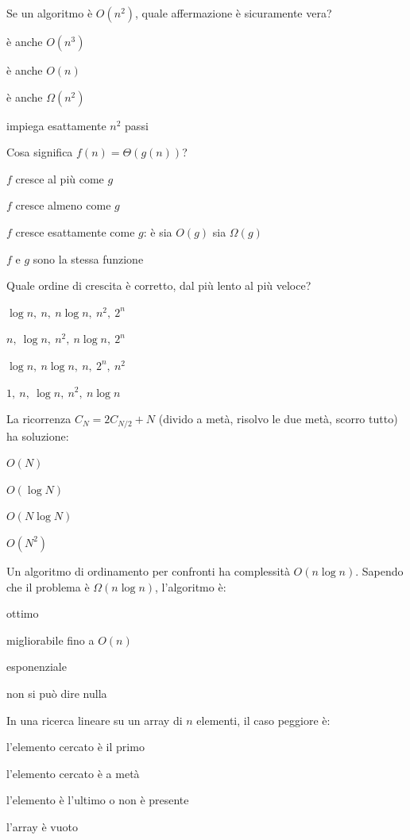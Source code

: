 \begin{quiz}{Se un algoritmo è $O(n^2)$, quale affermazione è sicuramente vera?}
  \item è anche $O(n^3)$
  \item è anche $O(n)$
  \item è anche $\Omega(n^2)$
  \item impiega esattamente $n^2$ passi
\end{quiz}

\begin{quiz}{Cosa significa $f(n) = \Theta(g(n))$?}
  \item $f$ cresce al più come $g$
  \item $f$ cresce almeno come $g$
  \item $f$ cresce esattamente come $g$: è sia $O(g)$ sia $\Omega(g)$
  \item $f$ e $g$ sono la stessa funzione
\end{quiz}

\begin{quiz}{Quale ordine di crescita è corretto, dal più lento al più veloce?}
  \item $\log n,\ n,\ n\log n,\ n^2,\ 2^n$
  \item $n,\ \log n,\ n^2,\ n\log n,\ 2^n$
  \item $\log n,\ n\log n,\ n,\ 2^n,\ n^2$
  \item $1,\ n,\ \log n,\ n^2,\ n\log n$
\end{quiz}

\begin{quiz}{La ricorrenza $C_N = 2C_{N/2} + N$ (divido a metà, risolvo le due metà, scorro tutto) ha soluzione:}
  \item $O(N)$
  \item $O(\log N)$
  \item $O(N \log N)$
  \item $O(N^2)$
\end{quiz}

\begin{quiz}{Un algoritmo di ordinamento per confronti ha complessità $O(n \log n)$. Sapendo che il problema è $\Omega(n \log n)$, l'algoritmo è:}
  \item ottimo
  \item migliorabile fino a $O(n)$
  \item esponenziale
  \item non si può dire nulla
\end{quiz}

\begin{quiz}{In una ricerca lineare su un array di $n$ elementi, il caso peggiore è:}
  \item l'elemento cercato è il primo
  \item l'elemento cercato è a metà
  \item l'elemento è l'ultimo o non è presente
  \item l'array è vuoto
\end{quiz}

